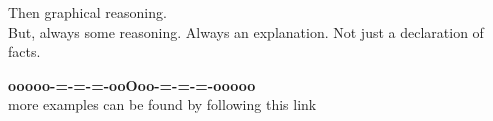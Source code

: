 \documentclass{ximera}
\begin{document}
Then graphical reasoning.  \\


But, always some reasoning.  Always an explanation. Not just a declaration of facts.








\begin{onlineOnly}
\begin{center}
\textbf{\textcolor{green!50!black}{ooooo-=-=-=-ooOoo-=-=-=-ooooo}} \\

more examples can be found by following this link\\ 

\end{center}
\end{onlineOnly}
\end{document}
